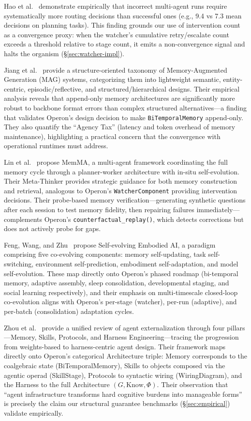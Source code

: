 Hao et al.~\cite{hao2026bigmas} demonstrate empirically that incorrect multi-agent runs require systematically more routing decisions than successful ones (e.g., 9.4 vs 7.3 mean decisions on planning tasks). This finding grounds our use of intervention count as a convergence proxy: when the watcher's cumulative retry/escalate count exceeds a threshold relative to stage count, it emits a non-convergence signal and halts the organism (\S\ref{sec:watcher-impl}).

Jiang et al.~\cite{jiang2026anatomy} provide a structure-oriented taxonomy of Memory-Augmented Generation (MAG) systems, categorizing them into lightweight semantic, entity-centric, episodic/reflective, and structured/hierarchical designs. Their empirical analysis reveals that append-only memory architectures are significantly more robust to backbone format errors than complex structured alternatives---a finding that validates Operon's design decision to make \texttt{BiTemporalMemory} append-only. They also quantify the ``Agency Tax'' (latency and token overhead of memory maintenance), highlighting a practical concern that the convergence with operational runtimes must address.

Lin et al.~\cite{lin2026memma} propose MemMA, a multi-agent framework coordinating the full memory cycle through a planner-worker architecture with in-situ self-evolution. Their Meta-Thinker provides strategic guidance for both memory construction and retrieval, analogous to Operon's \texttt{WatcherComponent} providing intervention decisions. Their probe-based memory verification---generating synthetic questions after each session to test memory fidelity, then repairing failures immediately---complements Operon's \texttt{counterfactual\_replay()}, which detects corrections but does not actively probe for gaps.

Feng, Wang, and Zhu~\cite{feng2026selfevolving} propose Self-evolving Embodied AI, a paradigm comprising five co-evolving components: memory self-updating, task self-switching, environment self-prediction, embodiment self-adaptation, and model self-evolution. These map directly onto Operon's phased roadmap (bi-temporal memory, adaptive assembly, sleep consolidation, developmental staging, and social learning respectively), and their emphasis on multi-timescale closed-loop co-evolution aligns with Operon's per-stage (watcher), per-run (adaptive), and per-batch (consolidation) adaptation cycles.

Zhou et al.~\cite{zhou2026externalization} provide a unified review of agent externalization through four pillars---Memory, Skills, Protocols, and Harness Engineering---tracing the progression from weights-based to harness-centric agent design.  Their framework maps directly onto Operon's categorical Architecture triple: Memory corresponds to the coalgebraic state (BiTemporalMemory), Skills to objects composed via the agentic operad (SkillStage), Protocols to syntactic wiring (WiringDiagram), and the Harness to the full Architecture $(G, \mathrm{Know}, \Phi)$.  Their observation that ``agent infrastructure transforms hard cognitive burdens into manageable forms'' is precisely the claim our structural guarantee benchmarks (\S\ref{sec:empirical}) validate empirically.

